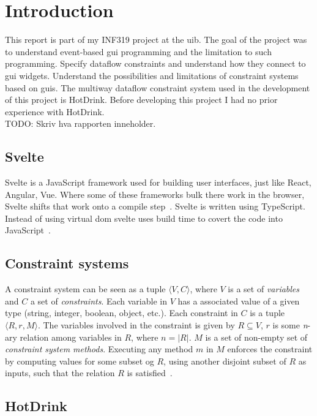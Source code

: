 \chapter{Introduction}

This report is part of my INF319 project at the \gls{uib}. The goal of the project was to
understand event-based \gls{gui} programming and the limitation to such programming.
Specify dataflow constraints and understand how they connect to \gls{gui} widgets.
Understand the possibilities and limitations of constraint systems based on \gls{gui}s.
The multiway dataflow constraint system used in the development of this project is
HotDrink. Before developing this project I had no prior experience with HotDrink. 
\\TODO: Skriv hva rapporten inneholder.
\newpage

\section{Svelte}
Svelte is a JavaScript framework used for building user interfaces, just like React, 
Angular, Vue. Where some of these frameworks bulk there work in the browser, Svelte 
shifts that work onto a compile step~\cite{sveltewebsite}. Svelte is written using 
TypeScript. Instead of using virtual \gls{dom} svelte uses build time to covert the 
code into JavaScript~\cite{sveltedocs}.

\section{Constraint systems}
\label{sec:constraint-systems}
A constraint system can be seen as a tuple ${\langle V, C \rangle}$, where $V$ is a set 
of \textit{variables} and $C$ a set of \textit{constraints}. Each variable in $V$ has a 
associated value of a given type (string, integer, boolean, object, etc.). Each 
constraint in $C$ is a tuple ${\langle R, r, M \rangle}$. The variables involved in the 
constraint is given by ${R \subseteq V}$, $r$ is some \textit{n}-ary relation among 
variables in $R$, where ${n = \lvert R \rvert}$. $M$ is a set of non-empty set of 
\textit{constraint system methods}. Executing any method $m$ in $M$ enforces the 
constraint by computing values for some subset og $R$, using another disjoint subset of 
$R$ as inputs, such that the relation $R$ is satisfied~\cite{AlgorithmsForUserInterfaces}. 

\section{HotDrink}

